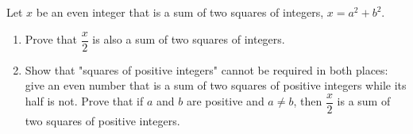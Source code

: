 Let $x$ be an even integer that is a sum of two squares of integers, $x=a^2+b^2$.
\begin{enumerate}
\item[(a)] Prove that $\dfrac {x}{2}$ is also a sum of two squares of integers.
\item[(b)] Show that "squares of positive integers" cannot be required in both places: give an even number that is a sum of two squares of positive integers while its half is not. Prove that if $a$ and $b$ are positive and $a\ne b$, then $\dfrac {x}{2}$ is a sum of two squares of positive integers.
\end{enumerate}

